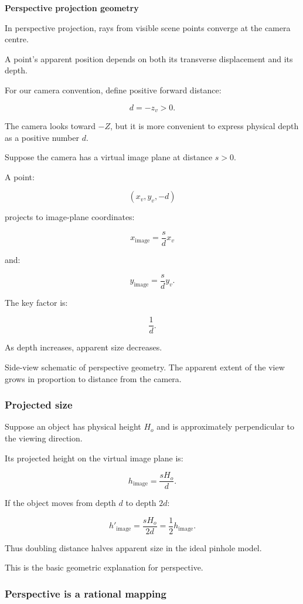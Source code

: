 \textbf{Perspective projection geometry}

In perspective projection, rays from visible scene points converge at the camera centre.

A point's apparent position depends on both its transverse displacement and its depth.

For our camera convention, define positive forward distance:

\[
 \boxed{d=-z_v>0}.
\]

The camera looks toward \(-Z\), but it is more convenient to express physical depth as a positive number \(d\).

Suppose the camera has a virtual image plane at distance \(s>0\).

A point:

\[
 (x_v,y_v,-d)
\]

projects to image-plane coordinates:

\[
 \boxed{ x_{\mathrm{image}}=\frac{s}{d}x_v }
\]

and:

\[
 \boxed{ y_{\mathrm{image}}=\frac{s}{d}y_v }.
\]

The key factor is:

\[
 \frac1d.
\]

As depth increases, apparent size decreases.

Side-view schematic of perspective geometry. The apparent extent of the view grows in proportion to distance from the camera.

\subsubsection{Projected size}\label{projected-size}

Suppose an object has physical height \(H_o\) and is approximately perpendicular to the viewing direction.

Its projected height on the virtual image plane is:

\[
 \boxed{ h_{\mathrm{image}}=\frac{sH_o}{d} }.
\]

If the object moves from depth \(d\) to depth \(2d\):

\[
 h'_{\mathrm{image}} = \frac{sH_o}{2d} = \frac12h_{\mathrm{image}}.
\]

Thus doubling distance halves apparent size in the ideal pinhole model.

This is the basic geometric explanation for perspective.

\subsubsection{Perspective is a rational mapping}\label{perspective-is-a-rational-mapping}

